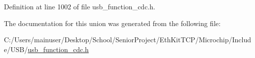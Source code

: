 Definition at line 1002 of file usb\+\_\+function\+\_\+cdc.\+h.



The documentation for this union was generated from the following file\+:\begin{DoxyCompactItemize}
\item 
C\+:/\+Users/mainuser/\+Desktop/\+School/\+Senior\+Project/\+Eth\+Kit\+T\+C\+P/\+Microchip/\+Include/\+U\+S\+B/\hyperlink{usb__function__cdc_8h}{usb\+\_\+function\+\_\+cdc.\+h}\end{DoxyCompactItemize}
